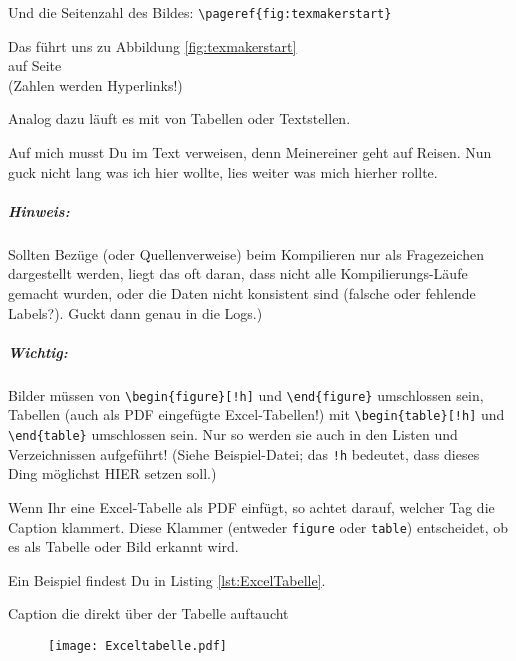 Und die Seitenzahl des Bildes: \verb|\pageref{fig:texmakerstart}|

Das führt uns zu Abbildung \ref{fig:texmakerstart} \\
auf Seite \pageref{fig:texmakerstart} \\
(Zahlen werden Hyperlinks!)

Analog dazu läuft es mit  von Tabellen oder Textstellen.


\begin{myfloatbox}[caption={myfloatbox-Testlisting},label={lst:Beispiellisting3}]
Auf mich  musst Du im Text verweisen,
denn Meinereiner geht auf Reisen.
Nun guck nicht lang was ich hier wollte,
lies weiter was mich hierher rollte.
\end{myfloatbox}



\subparagraph*{Hinweis:} Sollten Bezüge (oder Quellenverweise) beim Kompilieren nur als Fragezeichen dargestellt werden, liegt das oft daran, dass nicht alle Kompilierungs-Läufe gemacht wurden, oder die Daten nicht konsistent sind (falsche oder fehlende Labels?). Guckt dann genau in die Logs.)

\subparagraph*{Wichtig:} Bilder müssen von \verb|\begin{figure}[!h]| und \verb|\end{figure}| umschlossen sein, Tabellen (auch als PDF eingefügte Excel-Tabellen!) mit \verb|\begin{table}[!h]| und \verb|\end{table}| umschlossen sein. Nur so werden sie auch in den Listen und Verzeichnissen aufgeführt! (Siehe Beispiel-Datei; das \verb|!h| bedeutet, dass \latex dieses Ding möglichst HIER setzen soll.)

Wenn Ihr eine Excel-Tabelle als PDF einfügt, so achtet darauf, welcher Tag die Caption klammert. Diese Klammer (entweder \verb|figure| oder \verb|table|) entscheidet, ob es als Tabelle oder Bild erkannt wird.

Ein Beispiel findest Du in Listing \ref{lst:ExcelTabelle}.

\begin{mycodebox}[caption={Einbinden von Tabellen die als PDF vorliegen},label={lst:ExcelTabelle},language=TeX]
\begin{table}[!h]
 \caption[CaptionFürListing]{Caption die direkt über der Tabelle auftaucht}
 \label{tab:Textmarkenname} 	%
 \centering
   \begin{figure}
	\texttt{[image: Exceltabelle.pdf]} 
   \end{figure}	
\end{table}
\end{mycodebox}




